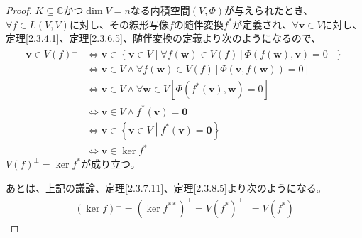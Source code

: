 \documentclass[dvipdfmx]{jsarticle}
\begin{document}
\begin{proof}
$K \subseteq \mathbb{C}$かつ$\dim V = n$なる内積空間$(V,\varPhi)$が与えられたとき、$\forall f \in L(V,V)$に対し、その線形写像$f$の随伴変換$f^{*}$が定義され、$\forall\mathbf{v} \in V$に対し、定理\ref{2.3.4.1}、定理\ref{2.3.6.5}、随伴変換の定義より次のようになるので、
\begin{align*}
\mathbf{v} \in {V(f)}^{\bot} &\Leftrightarrow \mathbf{v} \in \left\{ \mathbf{v} \in V \middle| \forall f\left( \mathbf{w} \right) \in V(f)\left[ \varPhi\left( f\left( \mathbf{w} \right),\mathbf{v} \right) = 0 \right] \right\}\\
&\Leftrightarrow \mathbf{v} \in V \land \forall f\left( \mathbf{w} \right) \in V(f)\left[ \varPhi\left( \mathbf{v},f\left( \mathbf{w} \right) \right) = 0 \right]\\
&\Leftrightarrow \mathbf{v} \in V \land \forall\mathbf{w} \in V\left[ \varPhi\left( f^{*}\left( \mathbf{v} \right),\mathbf{w} \right) = 0 \right]\\
&\Leftrightarrow \mathbf{v} \in V \land f^{*}\left( \mathbf{v} \right) = \mathbf{0}\\
&\Leftrightarrow \mathbf{v} \in \left\{ \mathbf{v} \in V \middle| f^{*}\left( \mathbf{v} \right) = \mathbf{0} \right\}\\
&\Leftrightarrow \mathbf{v} \in \ker f^{*}
\end{align*}
${V(f)}^{\bot} = \ker f^{*}$が成り立つ。\par
あとは、上記の議論、定理\ref{2.3.7.11}、定理\ref{2.3.8.5}より次のようになる。
\begin{align*}
\left( \ker f \right)^{\bot} = \left( \ker f^{**} \right)^{\bot} = {V\left( f^{*} \right)}^{\bot\bot} = V\left( f^{*} \right)
\end{align*}
\end{proof}
\end{document}

